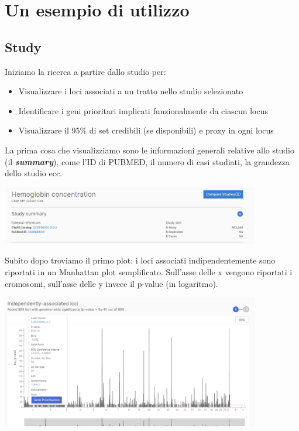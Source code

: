 \documentclass{article}
\begin{document}
\section{Un esempio di utilizzo}
\subsection{Study}
\begin{box4}
    [title={\textbf{Ricerca per Studio}}]
    {Iniziamo la ricerca a partire dallo studio per:
    \begin{itemize}
        \item Visualizzare i loci associati a un tratto nello studio selezionato
        \item Identificare i geni prioritari implicati funzionalmente da ciascun locus
        \item Visualizzare il 95\% di set credibili (se disponibili) e proxy in ogni locus
    \end{itemize}}
\end{box4}
La prima cosa che visualizziamo sono le informazioni generali relative allo studio (il \textit{\textbf{summary}}), come l'ID di PUBMED, il numero di casi studiati, la grandezza dello studio ecc.
\begin{center}
    \includegraphics[width=0.85\textwidth]{figures/4-Study.png}
\end{center}
Subito dopo troviamo il primo plot: i loci associati indipendentemente sono riportati in un Manhattan plot semplificato. Sull'asse delle x vengono riportati i cromosomi, sull'asse delle y invece il p-value (in logaritmo).
\begin{center}
    \includegraphics[width=0.85\textwidth]{figures/5-Study.png}
\end{center}
\end{document}
